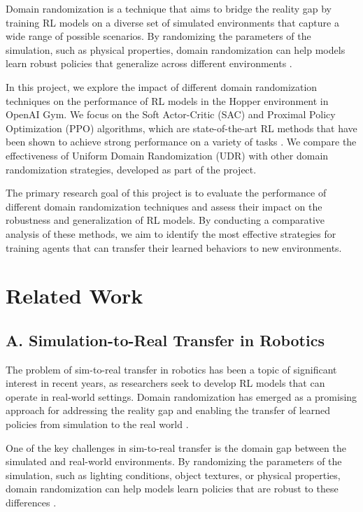 \documentclass[11pt]{article}
\begin{document}
Domain randomization is a technique that aims to bridge the reality gap by training RL models on a diverse set of simulated environments that capture a wide range of possible scenarios. By randomizing the parameters of the simulation, such as physical properties, domain randomization can help models learn robust policies that generalize across different environments \cite{Tobin2017, Peng2018}.

In this project, we explore the impact of different domain randomization techniques on the performance of RL models in the Hopper environment in OpenAI Gym. We focus on the Soft Actor-Critic (SAC) and Proximal Policy Optimization (PPO) algorithms, which are state-of-the-art RL methods that have been shown to achieve strong performance on a variety of tasks \cite{Haarnoja2018, Schulman2017}. We compare the effectiveness of Uniform Domain Randomization (UDR) with other domain randomization strategies, developed as part of the project. 

The primary research goal of this project is to evaluate the performance of different domain randomization techniques and assess their impact on the robustness and generalization of RL models. By conducting a comparative analysis of these methods, we aim to identify the most effective strategies for training agents that can transfer their learned behaviors to new environments.

\section{Related Work}

\subsection{A. Simulation-to-Real Transfer in Robotics}

The problem of sim-to-real transfer in robotics has been a topic of significant interest in recent years, as researchers seek to develop RL models that can operate in real-world settings. Domain randomization has emerged as a promising approach for addressing the reality gap and enabling the transfer of learned policies from simulation to the real world \cite{Peng2018}.

One of the key challenges in sim-to-real transfer is the domain gap between the simulated and real-world environments. By randomizing the parameters of the simulation, such as lighting conditions, object textures, or physical properties, domain randomization can help models learn policies that are robust to these differences \cite{Tobin2017}.
\end{document}
